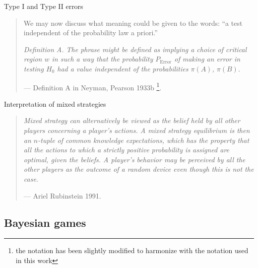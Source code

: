 \documentclass{beamer}
\theoremstyle{definition}
\begin{document}
\begin{frame}{Type I and Type II errors}

    \begin{quote}
    We may now discuss what meaning could be given to the words:
    ``a test independent of the probability law a priori.''

    {\it
    Definition A. The phrase might be defined as implying a choice
    of critical region $w$ in such a way that the probability $P_\mathrm{Error}$ of
    making an error in testing $H_0$ had a value independent of the
    probabilities $\pi(A)$, $\pi(B)$.
    }

    \hfill --- Definition A in Neyman, Pearson 1933b \footnote{the notation has been slightly modified to harmonize with the notation used in this work}.
    \end{quote}
    
\end{frame}

\begin{frame}{Interpretation of mixed strategies}

    \begin{quote}
    {\it
    Mixed strategy can alternatively be viewed as the belief held by all other players concerning a player's actions. A mixed strategy equilibrium is then an $n$-tuple of common knowledge expectations, which has the property that all the actions to which a strictly positive probability is assigned are optimal, given the beliefs. A player's behavior may be perceived by all the other players as the outcome of a random device even though this is not the case.
    }
    
    \hfill --- Ariel Rubinstein 1991.
    \end{quote}
    
\end{frame}

\subsection{Bayesian games}
\end{document}
